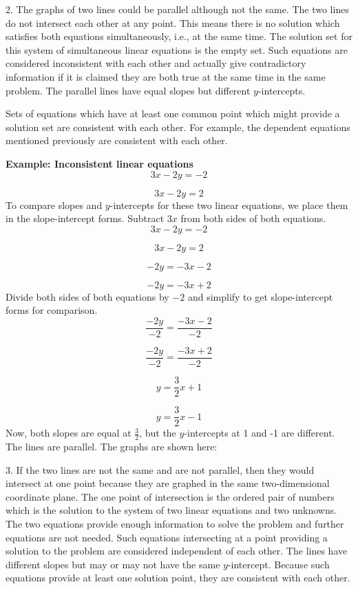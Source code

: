 2. The graphs of two lines could be parallel although not the same. The two lines do not intersect each other at any point. This means there is no solution which satisfies both equations simultaneously, i.e., at the same time. The solution set for this system of simultaneous linear equations is the empty set. Such equations are considered inconsistent with each other and actually give contradictory information if it is claimed they are both true at the same time in the same problem. The parallel lines have equal slopes but different $y$-intercepts.

Sets of equations which have at least one common point which might provide a solution set are consistent with each other. For example, the dependent equations mentioned previously are consistent with each other.

\textbf{Example: Inconsistent linear equations}
$$
3x - 2y = -2
$$

$$
3x - 2y = 2
$$
To compare slopes and $y$-intercepts for these two linear equations, we place them in the slope-intercept forms. Subtract $3x$ from both sides of both equations.
$$
3x - 2y = -2
$$

$$
3x - 2y = 2
$$

$$
-2y = -3x - 2
$$

$$
-2y = -3x + 2
$$
Divide both sides of both equations by $-2$ and simplify to get slope-intercept forms for comparison.
$$
\frac{-2y}{-2} = \frac{-3x - 2}{-2}
$$

$$
\frac{-2y}{-2} = \frac{-3x + 2}{-2}
$$

$$
y = \frac{3}{2}x + 1
$$

$$
y = \frac{3}{2}x - 1
$$
Now, both slopes are equal at $\frac{3}{2}$, but the $y$-intercepts at 1 and -1 are different. The lines are parallel. The graphs are shown here:


3. If the two lines are not the same and are not parallel, then they would intersect at one point because they are graphed in the same two-dimensional coordinate plane. The one point of intersection is the ordered pair of numbers which is the solution to the system of two linear equations and two unknowns. The two equations provide enough information to solve the problem and further equations are not needed. Such equations intersecting at a point providing a solution to the problem are considered independent of each other. The lines have different slopes but may or may not have the same $y$-intercept. Because such equations provide at least one solution point, they are consistent with each other.

